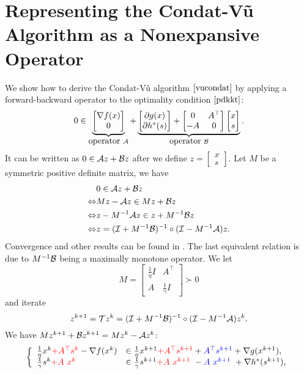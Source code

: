 \section{Representing the Condat-V\~{u} Algorithm as a Nonexpansive Operator}\label{sec:vc-op}
We show how to derive the Condat-V\~{u} algorithm $\eqref{vucondat}$ by applying a forward-backward operator to the optimality condition $\eqref{pdkkt}$:
\begin{equation}
0\in\underbrace{\begin{bmatrix}
\nabla f(x)\\
0
\end{bmatrix}}_{\mbox{operator}~\cA}+\underbrace{
\begin{bmatrix}
\partial g(x)\\
\partial h^*(s)
\end{bmatrix}+\begin{bmatrix}
0&A^\top\\
-A&0
\end{bmatrix}\begin{bmatrix}
x\\
s
\end{bmatrix}}_{\mbox{operator}~\cB}.
\end{equation} 
It can be written as $0\in{\mathcal{A}} z+{\mathcal{B}} z$ after we define $z=\begin{bmatrix}x\\ s\end{bmatrix}$. Let $M$ be a symmetric positive definite matrix, we have
\begin{align*}
&0\in\cA z+\cB z\\
\Leftrightarrow& Mz-\cA z \in Mz+\cB z\\
\Leftrightarrow& z-M^{-1}\cA z \in z+M^{-1}\cB z\\
\Leftrightarrow& z=(\cI+M^{-1}\cB)^{-1}\circ(\cI-M^{-1}\cA)z.
\end{align*}
Convergence and other results can be found in \cite{davis2014convergence}. The last equivalent relation is due to $M^{-1}{\mathcal{B}}$ being a maximally monotone operator. We let $$M=\begin{bmatrix}
\frac{1}{\eta}I&A^\top\\
A&\frac{1}{\gamma}I
\end{bmatrix}\succ 0$$
and iterate $$z^{k+1}={\mathcal{T}} z^k=({\mathcal{I}}+M^{-1}{\mathcal{B}})^{-1}\circ({\mathcal{I}}-M^{-1}{\mathcal{A}})z^k.$$
We have $Mz^{k+1}+{{\mathcal{B}}}z^{k+1}= Mz^k-{\mathcal{A}} z^k$:
$$\left\{\begin{array}{ll}
\frac{1}{\eta}x^k \textcolor{red}{ +A^\top s^{k}}- \nabla f(x^k)&\in \frac{1}{\eta}x^{k+1} \textcolor{red}{+ A^\top s^{k+1}}+\textcolor{blue}{A^\top s^{k+1}}+\nabla g (x^{k+1}),\\ 
\frac{1}{\gamma}s^k \textcolor{red}{+ A~ x^{k~}}&\in \frac{1}{\gamma}s^{k+1}\textcolor{red}{+ A~ x^{k+1~}} -\textcolor{blue}{A ~x^{k+1}} ~+\nabla h^*(s^{k+1}),
\end{array}\right.$$
